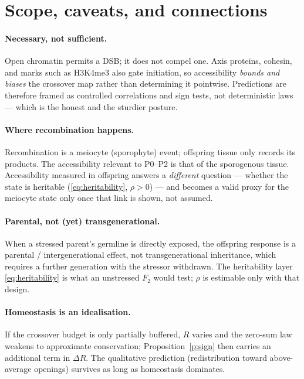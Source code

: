 \documentclass[11pt]{article}
\theoremstyle{remark}
\begin{document}
\section{Scope, caveats, and connections}
\label{sec:discussion}

\paragraph{Necessary, not sufficient.} Open chromatin permits a DSB; it does not
compel one. Axis proteins, cohesin, and marks such as H3K4me3 also gate
initiation, so accessibility \emph{bounds and biases} the crossover map rather
than determining it pointwise. Predictions are therefore framed as controlled
correlations and sign tests, not deterministic laws --- which is the honest and
the sturdier posture.

\paragraph{Where recombination happens.} Recombination is a meiocyte (sporophyte)
event; offspring tissue only records its products. The accessibility relevant to
P0--P2 is that of the sporogenous tissue. Accessibility measured in offspring
answers a \emph{different} question --- whether the state is heritable
(\eqref{eq:heritability}, $\rho>0$) --- and becomes a valid proxy for the meiocyte
state only once that link is shown, not assumed.

\paragraph{Parental, not (yet) transgenerational.} When a stressed parent's
germline is directly exposed, the offspring response is a parental /
intergenerational effect, not transgenerational inheritance, which requires a
further generation with the stressor withdrawn. The heritability layer
\eqref{eq:heritability} is what an unstressed $F_2$ would test; $\rho$ is
estimable only with that design.

\paragraph{Homeostasis is an idealisation.} If the crossover budget is only
partially buffered, $R$ varies and the zero-sum law weakens to approximate
conservation; Proposition~\ref{p:sign} then carries an additional term in
$\Delta R$. The qualitative prediction (redistribution toward above-average
openings) survives as long as homeostasis dominates.
\end{document}
